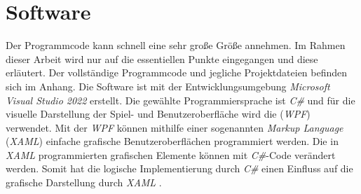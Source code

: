 
\chapter{Software}
Der Programmcode kann schnell eine sehr große Größe annehmen. Im Rahmen dieser Arbeit wird nur auf die essentiellen Punkte eingegangen und diese erläutert. Der vollständige Programmcode und jegliche Projektdateien befinden sich im Anhang. Die Software ist mit der Entwicklungsumgebung \textit{Microsoft Visual Studio 2022} erstellt. Die gewählte Programmiersprache ist \textit{C\#} und für die visuelle Darstellung der Spiel- und Benutzeroberfläche wird die  (\textit{WPF}) verwendet. Mit der \textit{WPF} können mithilfe einer sogenannten \textit{Markup Language} (\textit{XAML}) einfache grafische Benutzeroberflächen programmiert werden. Die in \textit{XAML} programmierten grafischen Elemente können mit \textit{C\#}-Code verändert werden. Somit hat die logische Implementierung durch \textit{C\#} einen Einfluss auf die grafische Darstellung durch \textit{XAML} \cite{WPF}.
